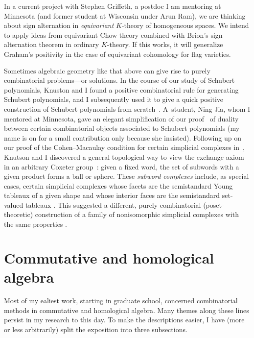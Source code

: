 \documentclass[11pt]{proposal}
\begin{document}
In a current project with Stephen Griffeth, a postdoc I am mentoring
at Minnesota (and former student at Wisconsin under Arun Ram), we are
thinking about sign alternation in \emph{equivariant} $K$-theory of
homogeneous spaces.  We intend to apply ideas from equivariant Chow
theory combined with Brion's sign alternation theorem in ordinary
$K$-theory.  If this works, it will generalize Graham's positivity
\cite{grahamPos} in the case of equivariant cohomology for flag
varieties.

Sometimes algebraic geometry like that above can give rise to purely
combinatorial problems---or solutions.  In the course of our study of
Schubert polynomials, Knuston and I found a positive combinatorial
rule for generating Schubert polynomials, and I subsequently used it
to give a quick positive construction of Schubert polynomials from
scratch~\cite{mitosis}.  A~student, Ning Jia, whom I mentored at
Minnesota, gave an elegant simplification \cite{njia} of our
proof~\cite{grobGeom} of duality between certain combinatorial objects
associated to Schubert polynomials (my name is on \cite{njia} for a
small contribution only because she insisted).  Following up on our
proof of the Cohen--Macaulay condition for certain simplicial
complexes in~\cite{grobGeom}, Knutson and I discovered a general
topological way to view the exchange axiom in an arbitrary Coxeter
group~\cite{subword}: given a fixed word, the set of subwords with a
given product forms a ball or sphere.  These \emph{subword complexes}
include, as special cases, certain simplicial complexes whose facets
are the semistandard Young tableaux of a given shape and whose
interior faces are the semistandard set-valued tableaux \cite{buchLR}.
This suggested a different, purely combinatorial (poset-theoretic)
construction of a family of nonisomorphic simplicial complexes with
the same properties \cite{tabComplex}.


\section{Commutative and homological algebra}%


\label{s:commalg}


Most of my ealiest work, starting in graduate school, concerned
combinatorial methods in commutative and homological algebra.  Many
themes along these lines persist in my research to this day.  To make
the descriptions easier, I have (more or less arbitrarily) split the
exposition into three subsections.
\end{document}
